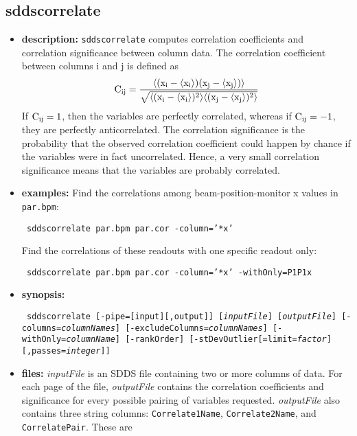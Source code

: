 \newpage
\subsection{sddscorrelate}
\label{sddscorrelate}

\begin{itemize}
\item {\bf description:} 
{\tt sddscorrelate} computes correlation coefficients and correlation
significance between column data.  The correlation coefficient between
columns i and j is defined as
\[ {\rm C_{ij} = \frac{\langle (x_i-\langle x_i \rangle) (x_j-\langle x_j \rangle)\rangle}
{\sqrt{\langle (x_i-\langle x_i \rangle)^2\rangle \langle (x_j - \langle x_j \rangle)^2 \rangle}}} \]
If ${\rm C_{ij}=1}$, then the variables are perfectly correlated, whereas if ${\rm C_{ij}=-1}$, they
are perfectly anticorrelated.
The correlation significance is the probability that the observed correlation coefficient could happen
by chance if the variables were in fact uncorrelated.  Hence, a very small correlation significance
means that the variables are probably correlated.
\item {\bf examples:}
Find the correlations among beam-position-monitor x values in {\tt par.bpm}:
\begin{flushleft}{\tt
sddscorrelate par.bpm par.cor -column='*x' 
}\end{flushleft}
Find the correlations of these readouts with one specific readout only:
\begin{flushleft}{\tt
sddscorrelate par.bpm par.cor -column='*x' -withOnly=P1P1x
}\end{flushleft}
\item {\bf synopsis:}
\begin{flushleft}{\tt
sddscorrelate [-pipe=[input][,output]] [{\em inputFile}] [{\em outputFile}] 
[-columns={\em columnNames}] [-excludeColumns={\em columnNames}] 
[-withOnly={\em columnName}] [-rankOrder]
[-stDevOutlier[=limit={\em factor}][,passes={\em integer}]]
}\end{flushleft}
\item {\bf files:}
        {\em inputFile} is an SDDS file containing two or more columns of data.  For each page of
        the file, {\em outputFile} contains the correlation coefficients and significance for
        every possible pairing of variables requested.  {\em outputFile} also contains three string
        columns: {\tt Correlate1Name}, {\tt Correlate2Name}, and {\tt CorrelatePair}.  These are

\end{itemize}
